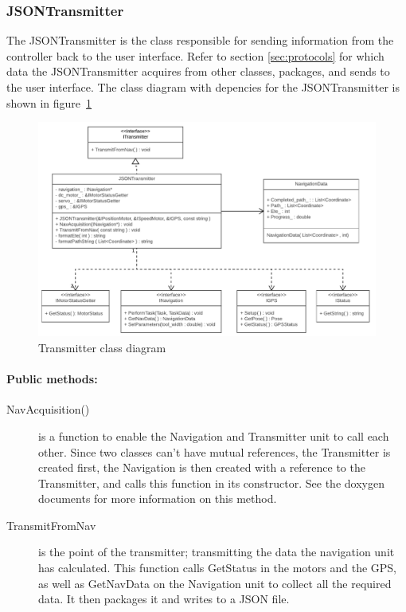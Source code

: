 \subsubsection{JSONTransmitter}

The JSONTransmitter is the class responsible for sending information from the controller back to the user interface. Refer to section \ref{sec:protocols} for which data the JSONTransmitter acquires from other classes, packages, and sends to the user interface. The class diagram with depencies for the JSONTransmitter is shown in figure~\ref{fig:Transmitter}

\begin{figure}[H]
\centering
\includegraphics[width=1\linewidth]{Images/Design/Transmitter_class_diagram}
\caption{Transmitter class diagram}
\label{fig:Transmitter}
\end{figure}

\paragraph{Public methods:}
\begin{adjustwidth}{2.5em}{0pt}\begin{description}
		\item [NavAcquisition()] is a function to enable the Navigation and Transmitter unit to call each other. Since two classes can't have mutual references, the Transmitter is created first, the Navigation is then created with a reference to the Transmitter, and calls this function in its constructor. See the doxygen documents for more information on this method.
		\item [TransmitFromNav] is the point of the transmitter; transmitting the data the navigation unit has calculated. This function calls GetStatus in the motors and the GPS, as well as GetNavData on the Navigation unit to collect all the required data. It then packages it and writes to a JSON file. 
\end{description}\end{adjustwidth}

